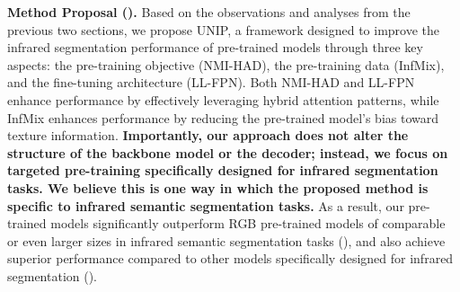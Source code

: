 \textbf{Method Proposal ().} Based on the observations and analyses from the previous two sections, we propose UNIP, a framework designed to improve the infrared segmentation performance of pre-trained models through three key aspects: the pre-training objective (NMI-HAD), the pre-training data (InfMix), and the fine-tuning architecture (LL-FPN). Both NMI-HAD and LL-FPN enhance performance by effectively leveraging hybrid attention patterns, while InfMix enhances performance by reducing the pre-trained model's bias toward texture information. \textbf{Importantly, our approach does not alter the structure of the backbone model or the decoder; instead, we focus on targeted pre-training specifically designed for infrared segmentation tasks. We believe this is one way in which the proposed method is specific to infrared semantic segmentation tasks.} As a result, our pre-trained models significantly outperform RGB pre-trained models of comparable or even larger sizes in infrared semantic segmentation tasks (), and also achieve superior performance compared to other models specifically designed for infrared segmentation ().